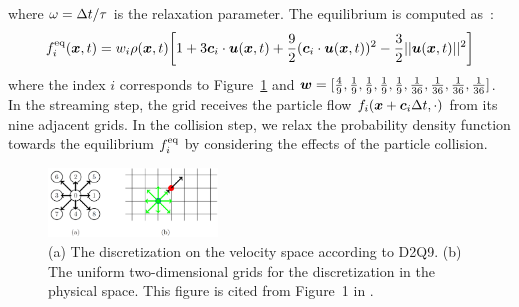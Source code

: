 where $\omega = \Delta t / \tau$ is the relaxation parameter.
The equilibrium is computed as~\cite{zhao2002non}:
\begin{equation}
\begin{aligned}
  f^{\rm eq}_i(\boldsymbol{x}, t) &=
  w_i \rho(\boldsymbol{x}, t) \biggl[
    1 + 3 \boldsymbol{c}_i \cdot \boldsymbol{u}(\boldsymbol{x}, t) +
    \frac{9}{2}(\boldsymbol{c}_i \cdot \boldsymbol{u}(\boldsymbol{x}, t))^2
    -\frac{3}{2} || \boldsymbol{u}(\boldsymbol{x}, t) ||^2
  \biggr] \\
\end{aligned}
\label{discretized-eq}
\end{equation}
where the index $i$ corresponds to Figure~\ref{fig:d2q9}
and $\boldsymbol{w} = [\frac{4}{9}, \frac{1}{9}, \frac{1}{9}, \frac{1}{9}, \frac{1}{9}, \frac{1}{36}, \frac{1}{36}, \frac{1}{36}, \frac{1}{36}]$.
In the streaming step, the grid receives 
the particle flow $f_i(\boldsymbol{x} + \boldsymbol{c}_i \Delta t, \cdot)$
from its nine adjacent grids.
In the collision step,
we relax the probability density function 
towards the equilibrium $f_i^{\rm eq}$
by considering the effects of the particle collision.

\begin{figure}[h!]
  \begin{center}
   \includegraphics[width=0.4\textwidth]{logos/Gitter_LBM.png}
   \vspace{-3mm}
   \caption{
      (a) The discretization on the velocity space according to D2Q9.
      (b) The uniform two-dimensional grids for
      the discretization in the physical space.
      This figure is cited from Figure~1 in \cite{pastewka2019hpc}.
   }
  \label{fig:d2q9}
  \end{center}
  \vspace{-10mm}
\end{figure}

